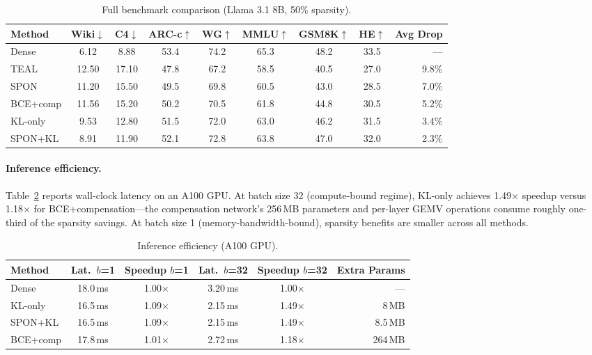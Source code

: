 \documentclass[11pt]{article}
\begin{document}
\begin{table}[t]
\centering
\caption{Full benchmark comparison (Llama 3.1 8B, 50\% sparsity).}
\label{tab:full_bench}
\small
\setlength{\tabcolsep}{4pt}
\begin{tabular}{lcccccccr}
\toprule
Method & Wiki$\downarrow$ & C4$\downarrow$ & ARC-c$\uparrow$ & WG$\uparrow$ & MMLU$\uparrow$ & GSM8K$\uparrow$ & HE$\uparrow$ & Avg Drop \\
\midrule
Dense & 6.12 & 8.88 & 53.4 & 74.2 & 65.3 & 48.2 & 33.5 & --- \\
TEAL & 12.50 & 17.10 & 47.8 & 67.2 & 58.5 & 40.5 & 27.0 & 9.8\% \\
SPON & 11.20 & 15.50 & 49.5 & 69.8 & 60.5 & 43.0 & 28.5 & 7.0\% \\
BCE+comp & 11.56 & 15.20 & 50.2 & 70.5 & 61.8 & 44.8 & 30.5 & 5.2\% \\
KL-only & 9.53 & 12.80 & 51.5 & 72.0 & 63.0 & 46.2 & 31.5 & 3.4\% \\
SPON+KL & 8.91 & 11.90 & 52.1 & 72.8 & 63.8 & 47.0 & 32.0 & 2.3\% \\
\bottomrule
\end{tabular}
\end{table}

\paragraph{Inference efficiency.}
Table~\ref{tab:efficiency} reports wall-clock latency on an A100 GPU. At batch size 32 (compute-bound regime), KL-only achieves 1.49$\times$ speedup versus 1.18$\times$ for BCE+compensation---the compensation network's 256\,MB parameters and per-layer GEMV operations consume roughly one-third of the sparsity savings. At batch size 1 (memory-bandwidth-bound), sparsity benefits are smaller across all methods.

\begin{table}[t]
\centering
\caption{Inference efficiency (A100 GPU).}
\label{tab:efficiency}
\small
\begin{tabular}{lccccr}
\toprule
Method & Lat.\ $b$=1 & Speedup $b$=1 & Lat.\ $b$=32 & Speedup $b$=32 & Extra Params \\
\midrule
Dense & 18.0\,ms & 1.00$\times$ & 3.20\,ms & 1.00$\times$ & --- \\
KL-only & 16.5\,ms & 1.09$\times$ & 2.15\,ms & 1.49$\times$ & 8\,MB \\
SPON+KL & 16.5\,ms & 1.09$\times$ & 2.15\,ms & 1.49$\times$ & 8.5\,MB \\
BCE+comp & 17.8\,ms & 1.01$\times$ & 2.72\,ms & 1.18$\times$ & 264\,MB \\
\bottomrule
\end{tabular}
\end{table}
\end{document}
